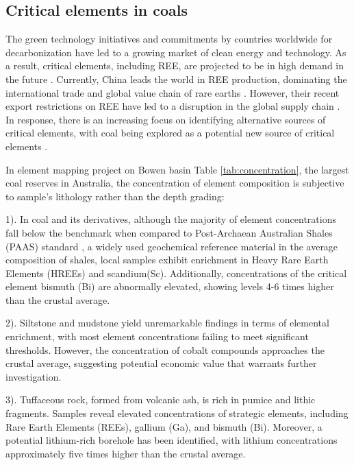 \documentclass[11pt,a4paper,]{article}
\begin{document}
\subsection{Critical elements in coals}\label{critical-elements-in-coals}

The green technology initiatives and commitments by countries worldwide for decarbonization have led to a growing market of clean energy and technology. As a result, critical elements, including REE, are projected to be in high demand in the future \autocite{usde2017}. Currently, China leads the world in REE production, dominating the international trade and global value chain of rare earths \autocite{us2024mineral}. However, their recent export restrictions on REE have led to a disruption in the global supply chain \autocite{MANCHERI2015262}. In response, there is an increasing focus on identifying alternative sources of critical elements, with coal being explored as a potential new source of critical elements \autocite{Hodgkinson2021}.

In \textcite{Hodgkinson2020} element mapping project on Bowen basin Table \ref{tab:concentration}, the largest coal reserves in Australia, the concentration of element composition is subjective to sample's lithology rather than the depth grading:

1). In coal and its derivatives, although the majority of element concentrations fall below the benchmark when compared to Post-Archaean Australian Shales (PAAS) standard \autocite{McLennan2011}, a widely used geochemical reference material in the average composition of shales, local samples exhibit enrichment in Heavy Rare Earth Elements (HREEs) and scandium(Sc). Additionally, concentrations of the critical element bismuth (Bi) are abnormally elevated, showing levels 4-6 times higher than the crustal average.

2). Siltstone and mudstone yield unremarkable findings in terms of elemental enrichment, with most element concentrations failing to meet significant thresholds. However, the concentration of cobalt compounds approaches the crustal average, suggesting potential economic value that warrants further investigation.

3). Tuffaceous rock, formed from volcanic ash, is rich in pumice and lithic fragments. Samples reveal elevated concentrations of strategic elements, including Rare Earth Elements (REEs), gallium (Ga), and bismuth (Bi). Moreover, a potential lithium-rich borehole has been identified, with lithium concentrations approximately five times higher than the crustal average.
\end{document}
